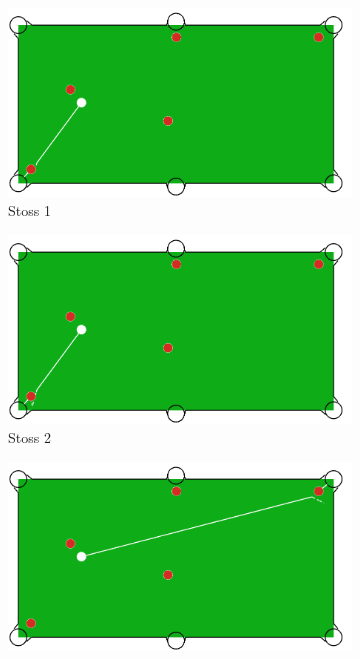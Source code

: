 \begin{figure}[h!]
    \centering
    \begin{subfigure}[b]{0.3\textwidth}
        \centering
        \includegraphics[width=1.0\linewidth]{../common/04_results/resources/simple_search/situation_diverse_solution_velocity_1.PNG}
        \caption{Stoss 1}
        \label{fig:situation_velocity_1_solution_1}
    \end{subfigure}
    \hfill
    \begin{subfigure}[b]{0.3\textwidth}
        \centering
        \includegraphics[width=1.0\linewidth]{../common/04_results/resources/simple_search/situation_diverse_solution_velocity_2.PNG}
        \caption{Stoss 2}
        \label{fig:situation_velocity_1_solution_2}
    \end{subfigure}
    \hfill
    \begin{subfigure}[b]{0.3\textwidth}
        \centering
        \includegraphics[width=1.0\linewidth]{../common/04_results/resources/simple_search/situation_diverse_solution_velocity_3.PNG}

\end{subfigure}
\end{figure}
